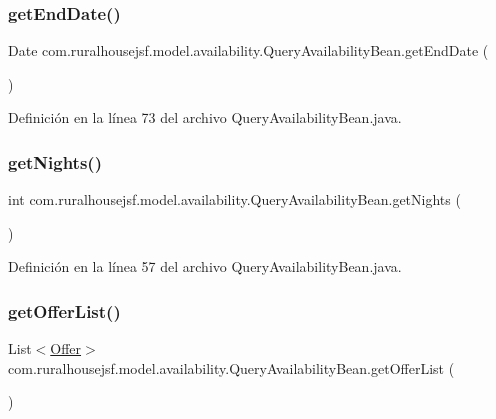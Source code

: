 \subsubsection{\texorpdfstring{getEndDate()}{getEndDate()}}
{\footnotesize\ttfamily Date com.\+ruralhousejsf.\+model.\+availability.\+Query\+Availability\+Bean.\+get\+End\+Date (\begin{DoxyParamCaption}{ }\end{DoxyParamCaption})}



Definición en la línea 73 del archivo Query\+Availability\+Bean.\+java.

\mbox{\label{classcom_1_1ruralhousejsf_1_1model_1_1availability_1_1_query_availability_bean_aa1f5ab5e45a1c5ccba0e3195bad30ffd}} 
\subsubsection{\texorpdfstring{getNights()}{getNights()}}
{\footnotesize\ttfamily int com.\+ruralhousejsf.\+model.\+availability.\+Query\+Availability\+Bean.\+get\+Nights (\begin{DoxyParamCaption}{ }\end{DoxyParamCaption})}



Definición en la línea 57 del archivo Query\+Availability\+Bean.\+java.

\mbox{\label{classcom_1_1ruralhousejsf_1_1model_1_1availability_1_1_query_availability_bean_ad9667676a26fe3df951a287607f14581}} 
\subsubsection{\texorpdfstring{getOfferList()}{getOfferList()}}
{\footnotesize\ttfamily List$<$\mbox{\hyperlink{classcom_1_1ruralhousejsf_1_1domain_1_1_offer}{Offer}}$>$ com.\+ruralhousejsf.\+model.\+availability.\+Query\+Availability\+Bean.\+get\+Offer\+List (\begin{DoxyParamCaption}{ }\end{DoxyParamCaption})}



